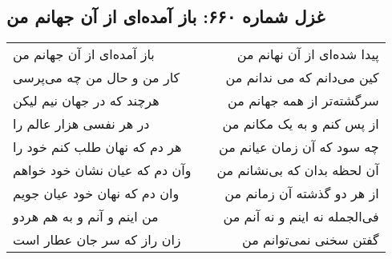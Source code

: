 \begin{center}
\section*{غزل شماره ۶۶۰: باز آمده‌ای از آن جهانم من}
\label{sec:660}
\begin{longtable}{l p{0.5cm} r}
باز آمده‌ای از آن جهانم من
&&
پیدا شده‌ای از آن نهانم من
\\
کار من و حال من چه می‌پرسی
&&
کین می‌دانم که می ندانم من
\\
هرچند که در جهان نیم لیکن
&&
سرگشته‌تر از همه جهانم من
\\
در هر نفسی هزار عالم را
&&
از پس کنم و به یک مکانم من
\\
هر دم که نهان طلب کنم خود را
&&
چه سود که آن زمان عیانم من
\\
وآن دم که عیان نشان خود خواهم
&&
آن لحظه بدان که بی‌نشانم من
\\
وان دم که نهان خود عیان جویم
&&
از هر دو گذشته آن زمانم من
\\
من اینم و آنم و به هم هردو
&&
فی‌الجمله نه اینم و نه آنم من
\\
زان راز که سر جان عطار است
&&
گفتن سخنی نمی‌توانم من
\\
\end{longtable}
\end{center}

